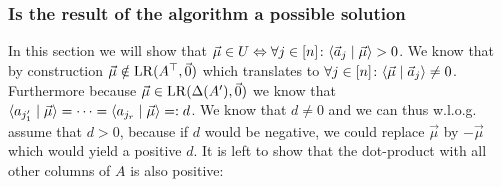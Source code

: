 \subsubsection{Is the result of the algorithm a possible solution}
In this section we will show that $\vec\mu \in U \Leftrightarrow \forall j \in [n]\colon \langle \vec a_j \mid \vec\mu \rangle>0$. We know that by construction $\vec\mu \notin \operatorname{LR}(A^\top, \vec0)$ which translates to $\forall j \in [n]\colon\langle \vec\mu \mid \vec a_j \rangle \neq 0$. Furthermore because $\vec\mu\in\operatorname{LR}(\Delta(A'), \vec0)$ we know that $\langle a_{j'_1} \mid \vec\mu \rangle = \dots = \langle a_{j_r} \mid \vec\mu \rangle =: d$. We know that $d \neq 0$ and we can thus w.l.o.g. assume that $d>0$, because if $d$ would be negative, we could replace $\vec\mu$ by $-\vec\mu$ which would yield a positive $d$. It is left to show that the dot-product with all other columns of $A$ is also positive:

